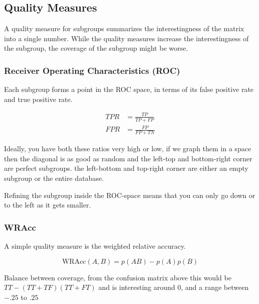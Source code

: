 \subsection{Quality Measures}

A quality measure for subgroups summarizes the interestingness
of the matrix into a single number. While the quality measures
increase the interestingness of the subgroup, the coverage of
the subgroup might be worse.

\subsubsection{Receiver Operating Characteristics (ROC)}

Each subgroup forms a point in the ROC space, in terms of its
false positive rate and true positive rate.

\begin{definition}
  \begin{align*}
    TPR &= \frac{TP}{TP + FP} \\
    FPR &= \frac{FP}{FP + TN}
  \end{align*}
\end{definition}

Ideally, you have both these ratios very high or low, if we
graph them in a space then the diagonal is as good as random
and the left-top and bottom-right corner are perfect subgroups.
the left-bottom and top-right corner are either an empty subgroup
or the entire database.

Refining the subgroup inside the ROC-space means that you can only
go down or to the left as it gets smaller.

\subsubsection{WRAcc}

A simple quality measure is the weighted relative accuracy.

\begin{definition}
  \begin{displaymath}
    \text{WRAcc}(A, B) = p(AB) - p(A)p(B)
  \end{displaymath}

  Balance between coverage, from the confusion matrix
  above this would be $TT - (TT + TF)(TT + FT)$ and is
  interesting around 0, and a range between $-.25$ to $.25$
\end{definition}

